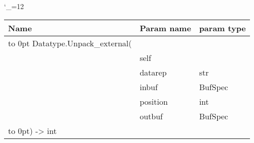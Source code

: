 \begingroup \catcode`\_=12 \tt
\begin{tabular}{lll}
\toprule
\textrm{Name}&\textrm{Param name}&\textrm{param type}\\
\midrule
\hbox to 0pt {Datatype.Unpack_external(\hss}\\
& self\\
& datarep & str\\
& inbuf & BufSpec\\
& position & int\\
& outbuf & BufSpec\\
\hbox to 0pt{) -> int\hss}\\
\bottomrule
\end{tabular}
\endgroup
